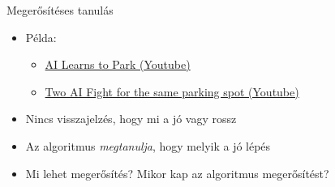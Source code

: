 \begin{frame}{Megerősítéses tanulás}
    \begin{itemize}
        \item Példa:
        \begin{itemize}
            \item \href{https://www.youtube.com/watch?v=VMp6pq6_QjI}{AI Learns to Park (Youtube)}
            \item \href{https://www.youtube.com/watch?v=CqYKhbyHFtA}{Two AI Fight for the same parking spot (Youtube)}
        \end{itemize}
        \item Nincs visszajelzés, hogy mi a jó vagy rossz
        \item Az algoritmus {\it megtanulja}, hogy melyik a jó lépés
        \item Mi lehet megerősítés? Mikor kap az algoritmus megerősítést?
    \end{itemize}
\end{frame}
